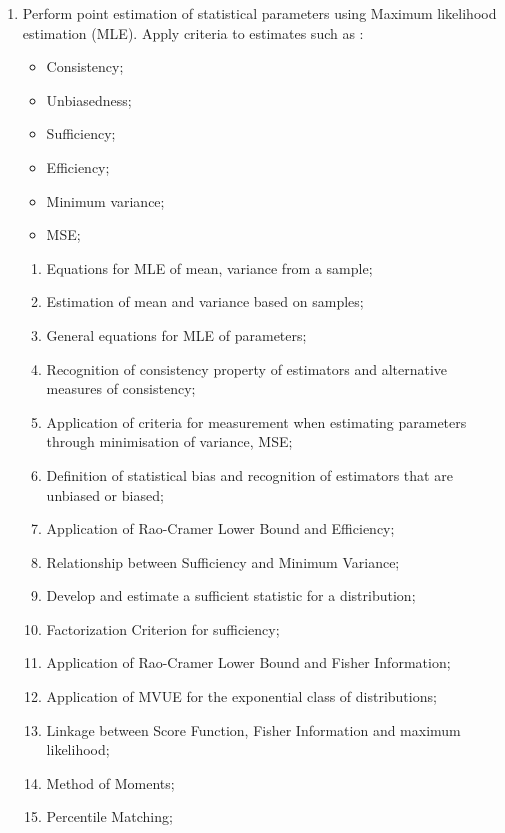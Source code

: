 \documentclass[12pt, titlepage, french]{report}
\begin{document}
\begin{outcomes}
\begin{enumerate}
	\item	Perform point estimation of statistical parameters using Maximum likelihood estimation (MLE). Apply criteria to estimates such as :
	\begin{multicols*}{2}
		\begin{itemize}
		\item	Consistency;
		\item	Unbiasedness;
		\item	Sufficiency;
		\item	Efficiency;
		\item	Minimum variance;
		\item	MSE;
		\end{itemize}
	\end{multicols*}
	\begin{knowledge}
	\begin{enumerate}[label = \alph*.]
	\item	Equations for MLE of mean, variance from a sample;
	\item	Estimation of mean and variance based on samples;
	\item	General equations for MLE of parameters;
	\item	Recognition of consistency property of estimators and alternative measures of consistency;
	\item	Application of criteria for measurement when estimating parameters through minimisation of variance, MSE;
	\item	Definition of statistical bias and recognition of estimators that are unbiased or biased;
	\item	Application of Rao-Cramer Lower Bound and Efficiency;
	\item	Relationship between Sufficiency and Minimum Variance;
	\item	Develop and estimate a sufficient statistic for a distribution;
	\item	Factorization Criterion for sufficiency;
	\item	Application of Rao-Cramer Lower Bound and Fisher Information;
	\item	Application of MVUE for the exponential class of distributions;
	\item	Linkage between Score Function, Fisher Information and maximum likelihood;
	\item	Method of Moments;
	\item	Percentile Matching;

\end{enumerate}
\end{knowledge}
\end{enumerate}
\end{outcomes}
\end{document}
